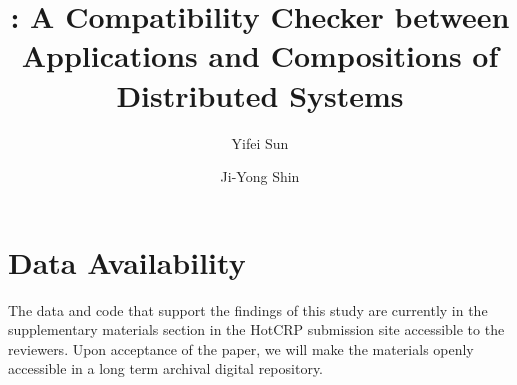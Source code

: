\documentclass[acmsmall,screen,review,anonymous]{acmart}
\begin{document}
\title{\sysname{}: A Compatibility Checker between Applications and
Compositions of Distributed Systems}

\author{Yifei Sun}

\author{Ji-Yong Shin}

\renewcommand{\shortauthors}{Sun et al.}

\begin{abstract}
  
\end{abstract}

%
%

\maketitle






%
%
%
%




\section*{Data Availability}
The data and code that support the findings of this study are currently in the supplementary materials section in the HotCRP submission site accessible to the reviewers. Upon acceptance of the paper, we will make the materials openly accessible in a long term archival digital repository. 



%
\end{document}
